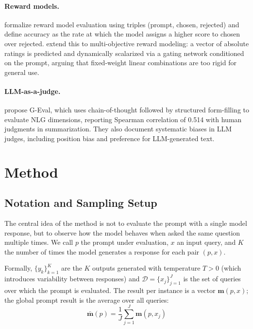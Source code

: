 \documentclass[11pt,a4paper]{article}
\begin{document}
\paragraph{Reward models.}
\citet{rewardbench2024} formalize reward model evaluation using triples (prompt, chosen, rejected) and define accuracy as the rate at which the model assigns a higher score to chosen over rejected. \citet{armorm2024} extend this to multi-objective reward modeling: a vector of absolute ratings is predicted and dynamically scalarized via a gating network conditioned on the prompt, arguing that fixed-weight linear combinations are too rigid for general use.

\paragraph{LLM-as-a-judge.}
\citet{geval2023} propose G-Eval, which uses chain-of-thought followed by structured form-filling to evaluate NLG dimensions, reporting Spearman correlation of 0.514 with human judgments in summarization. They also document systematic biases in LLM judges, including position bias and preference for LLM-generated text.

\section{Method}

\subsection{Notation and Sampling Setup}

The central idea of the method is not to evaluate the prompt with a single model response, but to observe how the model behaves when asked the same question multiple times. We call $p$ the prompt under evaluation, $x$ an input query, and $K$ the number of times the model generates a response for each pair $(p, x)$.

Formally, $\{y_k\}_{k=1}^{K}$ are the $K$ outputs generated with temperature $T > 0$ (which introduces variability between responses) and $\mathcal{D} = \{x_j\}_{j=1}^{J}$ is the set of queries over which the prompt is evaluated. The result per instance is a vector $\mathbf{m}(p, x)$; the global prompt result is the average over all queries:
\[
\bar{\mathbf{m}}(p) = \frac{1}{J} \sum_{j=1}^{J} \mathbf{m}(p, x_j)
\]
\end{document}
